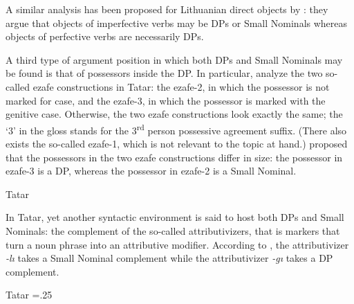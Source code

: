 \documentclass[output=paper]{langsci/langscibook}
\begin{document}
A similar analysis has been proposed for Lithuanian direct objects by \citet{GillonArmoskaite2015}: 
they argue that objects of imperfective verbs may be DPs or Small Nominals whereas objects of perfective verbs are necessarily DPs.

A third type of argument position in which both DPs and Small Nominals may be found is that of possessors inside the DP. 
In particular, \citet{LyutikovaPereltsvaig2015} analyze the two so-called ezafe constructions in Tatar: 
the ezafe-2, in which the possessor is not marked for case, 
and the ezafe-3, in which the possessor is marked with the genitive case. 
Otherwise, the two ezafe constructions look exactly the same; the `3' in the gloss stands for the 3\textsuperscript{rd} person possessive agreement suffix. 
(There also exists the so-called ezafe-1, which is not relevant to the topic at hand.) 
\citet{LyutikovaPereltsvaig2015} proposed that the possessors in the two ezafe constructions differ in size: 
the possessor in ezafe-3 is a DP, whereas the possessor in ezafe-2 is a Small Nominal. 

\ea%
    \label{pereex:4}
    Tatar 
    \z 
\z 

In Tatar, yet another syntactic environment is said to host both DPs and Small Nominals: 
the complement of the so-called attributivizers, that is markers that turn a noun phrase into an attributive modifier. 
According to \citet{LyutikovaPereltsvaig2015}, the attributivizer \textit{{}-lı} takes a Small Nominal complement 
while the attributivizer \textit{{}-gı} takes a DP complement.

\ea%
    \label{pereex:5}
    Tatar 
    \multicolsep=.25\baselineskip
    \begin{multicols}{2}\raggedcolumns
    \z\end{multicols}
\z 
\end{document}
